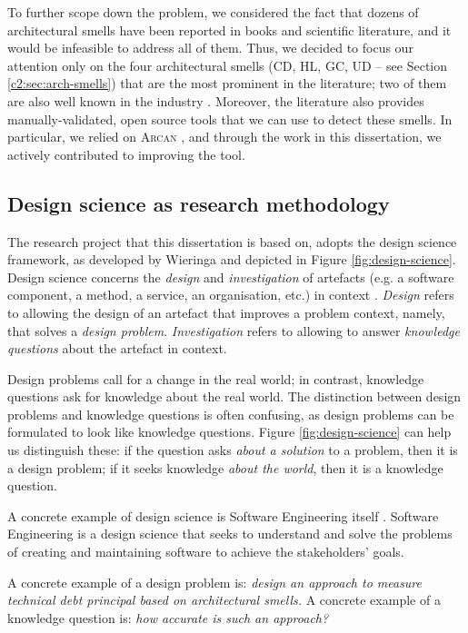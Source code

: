 To further scope down the problem, we considered the fact that dozens of architectural smells have been reported in books and scientific literature, and it would be infeasible to address all of them. Thus, we decided to focus our attention only on the four architectural smells (CD, HL, GC, UD -- see Section \ref{c2:sec:arch-smells}) that are the most prominent in the literature\cite{Azadi2019}; two of them are also well known in the industry \cite{Lippert2006,Martin2018}.
Moreover, the literature also provides manually-validated, open source tools that we can use to detect these smells.
In particular, we relied on \textsc{Arcan} \cite{Arcelli2016,Arcelli2017,Martini2018}, and through the work in this dissertation, we actively contributed to improving the tool.

\subsection{Design science as research methodology}
The research project that this dissertation is based on, adopts the design science framework, as developed by Wieringa \cite{Wieringa2014} and depicted in Figure \ref{fig:design-science}.
Design science concerns the \emph{design} and \emph{investigation} of artefacts (e.g. a software component, a method, a service, an organisation, etc.) in context \cite{Wieringa2014}.
\emph{Design} refers to allowing the design of an artefact that improves a problem context, namely, that solves a \emph{design problem}. 
\emph{Investigation} refers to allowing to answer \emph{knowledge questions} about the artefact in context.

Design problems call for a change in the real world; in contrast, knowledge questions ask for knowledge about the real world.
The distinction between design problems and knowledge questions is often confusing, as design problems can be formulated to look like knowledge questions.
Figure \ref{fig:design-science} can help us distinguish these: if the question asks  \emph{about a solution} to a problem, then it is a design problem; if it seeks knowledge \emph{about the world}, then it is a knowledge question.

A concrete example of design science is Software Engineering itself \cite{Wieringa2014}.
Software Engineering is a design science that seeks to understand and solve the problems of creating and maintaining software to achieve the stakeholders' goals.

A concrete example of a design problem is: \emph{design an approach to measure technical debt principal based on architectural smells.}
A concrete example of a knowledge question is: \emph{how accurate is such an approach?}


